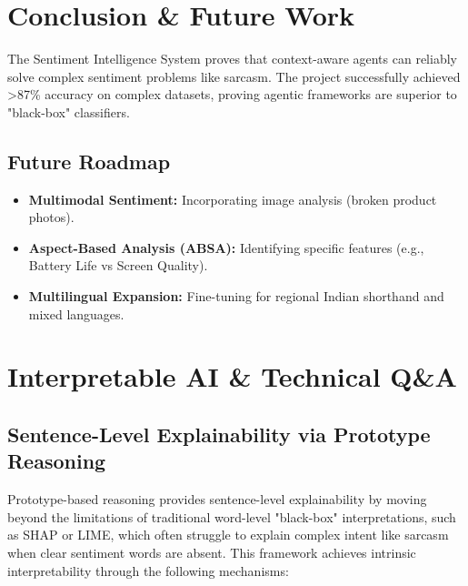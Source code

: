 \documentclass[11pt,oneside]{scrbook}
\begin{document}
\chapter{Conclusion \& Future Work}
The Sentiment Intelligence System proves that context-aware agents can reliably solve complex sentiment problems like sarcasm. The project successfully achieved >87\% accuracy on complex datasets, proving agentic frameworks are superior to "black-box" classifiers.

\section{Future Roadmap}
\begin{itemize}
    \item \textbf{Multimodal Sentiment:} Incorporating image analysis (broken product photos).
    \item \textbf{Aspect-Based Analysis (ABSA):} Identifying specific features (e.g., Battery Life vs Screen Quality).
    \item \textbf{Multilingual Expansion:} Fine-tuning for regional Indian shorthand and mixed languages.
\end{itemize}

\appendix
\chapter{Interpretable AI \& Technical Q\&A}

\section{Sentence-Level Explainability via Prototype Reasoning}
Prototype-based reasoning provides sentence-level explainability by moving beyond the limitations of traditional word-level "black-box" interpretations, such as SHAP or LIME, which often struggle to explain complex intent like sarcasm when clear sentiment words are absent. This framework achieves intrinsic interpretability through the following mechanisms:
\end{document}
